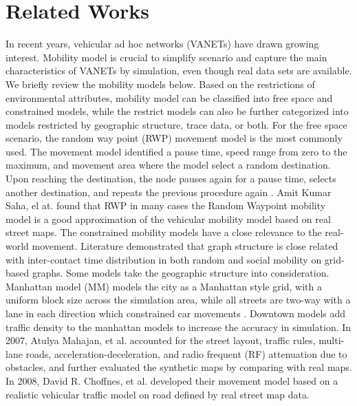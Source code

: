 \section{Related Works}
\label{section_related_works}

In recent years, vehicular ad hoc networks (VANETs) have drawn growing interest. Mobility model is crucial to simplify scenario and capture the main characteristics of VANETs by simulation, even though real data sets are available. We briefly review the mobility models below.
Based on the restrictions of environmental attributes, mobility model can be classified into free space and constrained models\cite{LuChen-104,AhmedKarmakar-106}, while the restrict models can also be further categorized into models restricted by geographic structure, trace data, or both.
For the free space scenario, the random way point (RWP)\cite{broch1998performance} movement model is the most commonly used. The movement model identified a pause time, speed range from zero to the maximum, and movement area where the model select a random destination. Upon reaching the destination, the node pauses again for a pause time, selects another destination, and repeats the previous procedure again \cite{broch1998performance} . Amit Kumar Saha, el at. \cite{SahaJohnson-91} found that RWP in many cases the Random Waypoint mobility model is a good approximation of the vehicular mobility model based on real street maps.
The constrained mobility models have a close relevance to the real-world movement. Literature \cite{MayerWaldhorst-108} demonstrated that graph structure is close related with inter-contact time distribution in both random and social mobility on grid-based graphs. Some models \cite{SahaJohnson-91,PengDong-101,HuangZhu-88,MartinezCano-87,ChoffnesBustamante-93} take the geographic structure into consideration. Manhattan model (MM) models the city as a Manhattan style grid, with a uniform block size across the simulation area, while all streets are two-way with a lane in each direction which constrained car movements \cite{MartinezCano-87}. Downtown models add traffic density to the manhattan models to increase the accuracy in simulation. In 2007, Atulya Mahajan, et al. \cite{MahajanPotnis-102} accounted for the street layout, traffic rules, multi-lane roads, acceleration-deceleration, and radio frequent (RF) attenuation due to obstacles, and further evaluated the synthetic maps by comparing with real maps. In 2008, David R. Choffnes, et al.\cite{ChoffnesBustamante-93} developed their movement model based on a realistic vehicular traffic model on road defined by real street map data.

